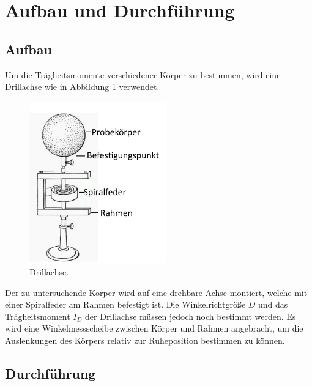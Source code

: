 \section{Aufbau und Durchführung}
\label{sec:Durchführung}
\subsection{Aufbau}
Um die Trägheitsmomente verschiedener Körper zu bestimmen, wird eine Drillachse wie in Abbildung \ref{df:1} verwendet.

\begin{figure}
  \centering
  \includegraphics[height=7cm]{Aufbau.png}
  \caption{Drillachse.}
  \label{df:1}
\end{figure}

Der zu untersuchende Körper wird auf eine drehbare Achse montiert, welche mit einer Spiralfeder am Rahmen befestigt ist.
Die Winkelrichtgröße $D$ und das Trägheitsmoment $I_{D}$ der Drillachse müssen jedoch noch bestimmt werden.
Es wird eine Winkelmessscheibe zwischen Körper und Rahmen angebracht, um die Auslenkungen des Körpers relativ zur Ruheposition bestimmen zu können.

\subsection{Durchführung}

